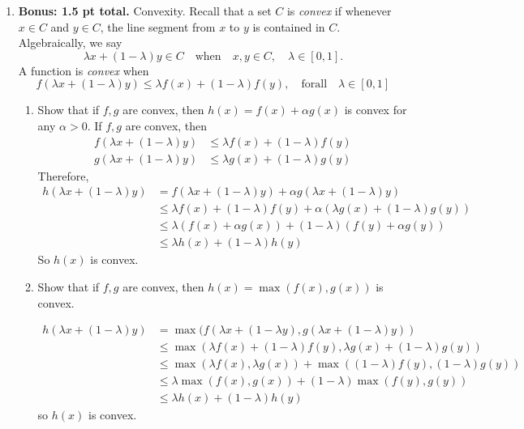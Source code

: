 \documentclass[11pt]{amsart}
\theoremstyle{plain}
\theoremstyle{definition}
\begin{document}
\begin{enumerate}
\begin{enumerate}
\end{enumerate}

\bigskip 
 

\item{\bf Bonus: 1.5 pt total.} Convexity. Recall that a set $C$ is {\it convex} if whenever $x\in C$ and $y\in C$,
the line segment from $x$ to $y$ is contained in $C$. Algebraically, we say 
\[
\lambda x + (1-\lambda)y \in C \quad \mathrm{when} \quad x,y \in C, \quad \lambda \in [0,1].
\]
A function is {\it convex} when 
\[
f(\lambda x + (1-\lambda)y) \leq \lambda f(x) + (1-\lambda) f(y), \quad \mathrm{for all} \quad \lambda \in [0,1]
\]

\bigskip
\begin{enumerate}
\item Show that if $f, g$ are convex, then $h(x) = f(x)+\alpha g(x)$ is convex for any $\alpha > 0$.  
 If $f, g$ are convex, then 
\begin{align} \nonumber
f(\lambda x + (1 - \lambda) y) &\leq \lambda f(x) + (1 - \lambda)f(y) \\ \nonumber
g(\lambda x + (1 - \lambda)y) &\leq \lambda g(x) + (1 - \lambda)g(y)
\end{align}
Therefore,
\begin{align} \nonumber
h(\lambda x + (1 - \lambda)y) &= f(\lambda x + (1 - \lambda) y) + \alpha g(\lambda x + (1 - \lambda)y) \\ \nonumber
									&\leq \lambda f(x) + (1 - \lambda)f(y) + \alpha (\lambda g(x) + (1 - \lambda)g(y)) \\ \nonumber
									&\leq \lambda (f(x) + \alpha g(x)) + (1 - \lambda)(f(y) + \alpha g(y)) \\ \nonumber
									&\leq \lambda h(x) + (1 - \lambda) h(y)
\end{align}
So $h(x)$ is convex. 
\item Show that if $f, g$ are convex, then $h(x) = \max(f(x), g(x))$ is convex. 

\begin{align} \nonumber
h(\lambda x + (1 - \lambda)y) &= \max(f(\lambda x + (1 - \lambda y), g(\lambda x + (1 - \lambda)y)) \\ \nonumber
									&\leq \max(\lambda f(x) + (1 - \lambda)f(y), \lambda g(x) + (1 - \lambda)g(y)) \\ \nonumber
									&\leq \max(\lambda f(x), \lambda g(x)) + \max((1 - \lambda)f(y), (1 - \lambda)g(y)) \\ \nonumber
									&\leq \lambda \max(f(x), g(x)) + (1 - \lambda)\max(f(y), g(y)) \\ \nonumber
									&\leq \lambda h(x) + (1 - \lambda) h(y)
\end{align}
so $h(x)$ is convex. 


\end{enumerate}
\end{enumerate}
\end{document}
